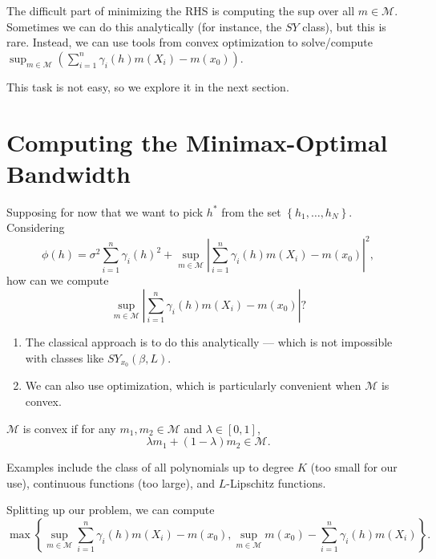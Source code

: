 The difficult part of minimizing the RHS is computing the sup over all $m \in \mathscr{M}$. Sometimes we can do this analytically (for instance, the $SY$ class), but this is rare. Instead, we can use tools from convex optimization to solve/compute $\sup_{m \in \mathscr{M}} \left( \sum\limits_{i=1}^{n} \gamma_i(h) m(X_i) - m(x_0) \right)$.

This task is not easy, so we explore it in the next section.

\section{Computing the Minimax-Optimal Bandwidth}



Supposing for now that we want to pick $h^*$ from the set $\left\{h_1,\ldots,h_N\right\}$. 
Considering \[
	\phi(h) = \sigma^2 \sum\limits_{i=1}^{n} \gamma_i(h)^2 + \sup_{m \in \mathscr{M}} \left| \sum\limits_{i=1}^{n} \gamma_i(h) m(X_i) - m(x_0) \right|^2
,\] 
how can we compute \[
	\sup_{m \in \mathscr{M}} \left| \sum\limits_{i=1}^{n} \gamma_i(h) m(X_i) - m(x_0) \right|
?\] 
\begin{enumerate}[label=(\roman*)]
	\item The classical approach is to do this analytically --- which is not impossible with classes like $SY_{x_0}(\beta, L)$.
	\item We can also use optimization, which is particularly convenient when $\mathscr{M}$ is convex.
\end{enumerate}
\begin{definition}
	$\mathscr{M}$ is convex if for any $m_1,m_2 \in \mathscr{M}$ and $\lambda \in [0,1]$, \[
		\lambda m_1 + (1-\lambda)m_2 \in \mathscr{M}
	.\] 
\end{definition}
Examples include the class of all polynomials up to degree $K$ (too small for our use), continuous functions (too large), and $L$-Lipschitz functions.

Splitting up our problem, we can compute \begin{equation} \label{2-11-1}
	\max \left\{\sup_{m \in \mathscr{M}} \sum\limits_{i=1}^{n} \gamma_i(h)m(X_i) - m(x_0), \sup_{m \in \mathscr{M}}m(x_0) - \sum\limits_{i=1}^{n} \gamma_i(h)m(X_i)\right\}
.\end{equation} 

